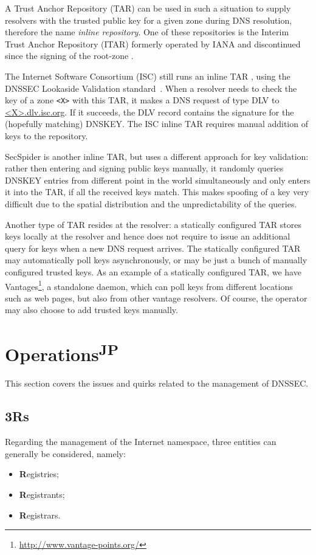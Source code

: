 \documentclass[a4paper,twocolumn]{scrartcl}
\newcommand{\wbjp}{\textsuperscript{JP}}
\begin{document}
A Trust Anchor Repository (TAR) can be used in such a situation to
supply resolvers with the trusted public key for a given zone during
DNS resolution, therefore the name \emph{inline repository}. One of
these repositories is the Interim Trust Anchor Repository (ITAR)
formerly operated by IANA and discontinued since the signing of the
root-zone \cite{itar}.

The Internet Software Consortium (ISC) still runs an inline TAR
\cite{iscDlv}, using the DNSSEC Lookaside Validation standard~\cite{RFC5074}. When a resolver needs to check the key of a zone
\verb|<X>| with this TAR, it makes a DNS request of type DLV to 
\url{<X>.dlv.isc.org}. If it succeeds, the DLV record contains the
signature for the (hopefully matching) DNSKEY. The ISC inline TAR
requires manual addition of keys to the repository.

SecSpider \cite{secspider, Osterweil09} is another inline TAR, but
uses a different approach for key validation: rather then entering and
signing public keys manually, it randomly queries DNSKEY entries from
different point in the world simultaneously and only enters it into
the TAR, if all the received keys match. This makes spoofing of a key
very difficult due to the spatial distribution and the
unpredictability of the queries.

Another type of TAR resides at the resolver: a statically configured
TAR stores keys locally at the resolver and hence does not require to issue an
additional query for keys when a new DNS request arrives. The
statically configured TAR may automatically poll keys asynchronously,
or may be just a bunch of manually configured trusted keys. As an
example of a statically configured TAR, we have
Vantages\footnote{\url{http://www.vantage-points.org/}}, a standalone
daemon, \cite{Osterweil09} which can poll keys from different
locations such as web pages, but also from other vantage resolvers. Of
course, the operator may also choose to add trusted keys manually.

\section{Operations\wbjp}
This section covers the issues and quirks related to the management of DNSSEC.
\subsection{3Rs}
Regarding the management of the Internet namespace, three entities can generally be considered, namely:
\begin{itemize}
\item \textbf{R}egistries;
\item \textbf{R}egistrants;
\item \textbf{R}egistrars.
\end{itemize}
\end{document}
